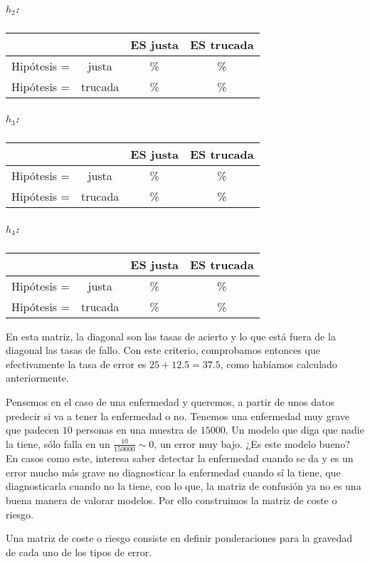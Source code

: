 \documentclass{apuntes}
\begin{document}
\subparagraph{$h_2$:}
\begin{center}
\begin{tabular}{cc|cc}
 && ES justa & ES trucada \\\hline
 Hipótesis =& justa & \% & \%\\
 Hipótesis =& trucada &\% & \%
\end{tabular}
\end{center}


\subparagraph{$h_3$:}
\begin{center}
\begin{tabular}{cc|cc}
 && ES justa & ES trucada \\\hline
 Hipótesis =& justa & \% & \%\\
 Hipótesis =& trucada & \% & \%
\end{tabular}
\end{center}


\subparagraph{$h_4$:}
\begin{center}
\begin{tabular}{cc|cc}
 && ES justa & ES trucada \\\hline
 Hipótesis =& justa & \% & \%\\
 Hipótesis =& trucada & \% & \%
\end{tabular}
\end{center}

En esta matriz, la diagonal son las tasas de acierto y lo que está fuera de la diagonal las tasas de fallo. Con este criterio, comprobamos entonces que efectivamente la tasa de error es $25+12.5 = 37.5$, como habíamos calculado anteriormente.




Pensemos en el caso de una enfermedad y queremos, a partir de unos datos predecir si va a tener la enfermedad o no. Tenemos una enfermedad muy grave que padecen $10$ personas en una muestra de $15000$. Un modelo que diga que nadie la tiene, sólo falla en un $\frac{10}{150000} \sim 0$, un error muy bajo. ¿Es este modelo bueno? En casos como este, interesa saber detectar la enfermedad cuando se da y es un error mucho más grave no diagnosticar la enfermedad cuando sí la tiene, que diagnosticarla cuando no la tiene, con lo que, la matriz de confusión ya no es una buena manera de valorar modelos. Por ello construimos la matriz de coste o riesgo.

\begin{defn}
	Una matriz de coste o riesgo consiste en definir ponderaciones para la gravedad de cada uno de los tipos de error. 
\end{defn}
\end{document}
